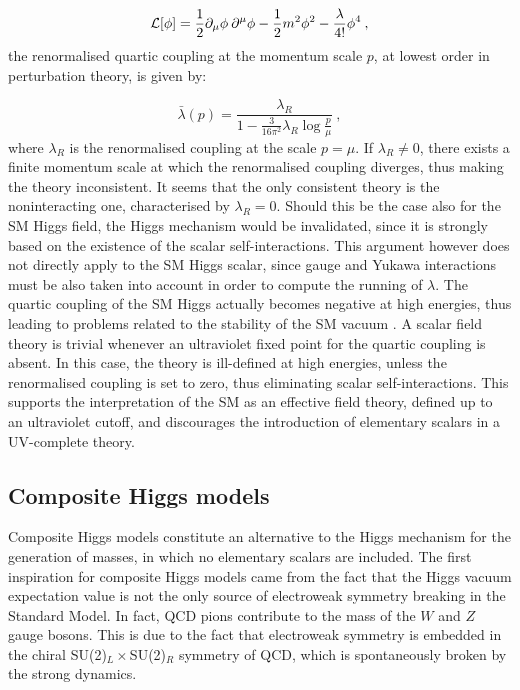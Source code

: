  \begin{equation}
 \mathcal L [\phi] = \frac{1}{2} \partial_{\mu} \phi \: \partial^{\mu} \phi - \frac{1}{2} m^2 \phi^2 - \frac{\lambda}{4!} \phi^4 \: ,
 \end{equation}
 the renormalised quartic coupling at the momentum scale $p$, at lowest order in perturbation theory, is given by:
 
 \begin{equation}
 \bar \lambda (p) = \frac{\lambda_R}{1- \frac{3}{16 \pi^2}  \lambda_R \log\frac{p}{\mu}} \: ,
 \label{trivial_running}
 \end{equation}
 where $\lambda_R$ is the renormalised coupling at the scale $p = \mu$. If $\lambda_R \neq 0$, there exists a finite momentum scale at which the renormalised coupling diverges, thus making the theory inconsistent. It seems that the only consistent theory is the noninteracting one, characterised by $\lambda_R = 0$. Should this be the case also for the SM Higgs field, the Higgs mechanism would be invalidated, since it is strongly based on the existence of the scalar self-interactions. 
 This argument however does not directly apply to the SM Higgs scalar, since gauge and Yukawa interactions must be also taken into account in order to compute the running of $\lambda$. The quartic coupling of the SM Higgs actually becomes negative at high energies, thus leading to problems related to the stability of the SM vacuum \cite{Degrassi:2012ry}. A scalar field theory is trivial whenever an ultraviolet fixed point for the quartic coupling is absent. In this case, the theory is ill-defined at high energies, unless the renormalised coupling is set to zero, thus eliminating scalar self-interactions. This supports the interpretation of the SM as an effective field theory, defined up to an ultraviolet cutoff, and discourages the introduction of elementary scalars in a UV-complete theory.
 


\subsection{Composite Higgs models}

Composite Higgs models constitute an alternative to the Higgs mechanism for the generation of masses, in which no elementary scalars are included. The first inspiration for composite Higgs models came from the fact that the Higgs vacuum expectation value is not the only source of electroweak symmetry breaking in the Standard Model. In fact, QCD pions contribute to the mass of the $W$ and $Z$ gauge bosons. This is due to the fact that electroweak symmetry is embedded in the chiral SU(2)$_L\times$SU(2)$_R$ symmetry of QCD, which is spontaneously broken by the strong dynamics.

